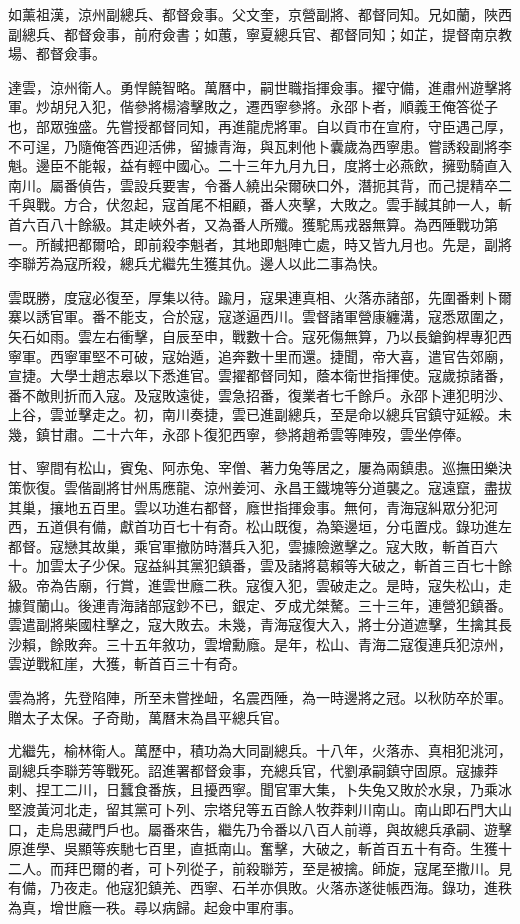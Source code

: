 \begin{pinyinscope}
如薰祖漢，涼州副總兵、都督僉事。父文奎，京營副將、都督同知。兄如蘭，陜西副總兵、都督僉事，前府僉書；如蕙，寧夏總兵官、都督同知；如芷，提督南京教場、都督僉事。

達雲，涼州衛人。勇悍饒智略。萬曆中，嗣世職指揮僉事。擢守備，進肅州遊擊將軍。炒胡兒入犯，偕參將楊濬擊敗之，遷西寧參將。永邵卜者，順義王俺答從子也，部眾強盛。先嘗授都督同知，再進龍虎將軍。自以貢市在宣府，守臣遇己厚，不可逞，乃隨俺答西迎活佛，留據青海，與瓦剌他卜囊歲為西寧患。嘗誘殺副將李魁。邊臣不能報，益有輕中國心。二十三年九月九日，度將士必燕飲，擁勁騎直入南川。屬番偵告，雲設兵要害，令番人繞出朵爾硤口外，潛扼其背，而己提精卒二千與戰。方合，伏忽起，寇首尾不相顧，番人夾擊，大敗之。雲手馘其帥一人，斬首六百八十餘級。其走峽外者，又為番人所殲。獲駝馬戎器無算。為西陲戰功第一。所馘把都爾哈，即前殺李魁者，其地即魁陣亡處，時又皆九月也。先是，副將李聯芳為寇所殺，總兵尤繼先生獲其仇。邊人以此二事為快。

雲既勝，度寇必復至，厚集以待。踰月，寇果連真相、火落赤諸部，先圍番剌卜爾寨以誘官軍。番不能支，合於寇，寇遂逼西川。雲督諸軍營康纏溝，寇悉眾圍之，矢石如雨。雲左右衝擊，自辰至申，戰數十合。寇死傷無算，乃以長鎗鉤桿專犯西寧軍。西寧軍堅不可破，寇始遁，追奔數十里而還。捷聞，帝大喜，遣官告郊廟，宣捷。大學士趙志皋以下悉進官。雲擢都督同知，蔭本衛世指揮使。寇歲掠諸番，番不敵則折而入寇。及寇敗遠徙，雲急招番，復業者七千餘戶。永邵卜連犯明沙、上谷，雲並擊走之。初，南川奏捷，雲已進副總兵，至是命以總兵官鎮守延綏。未幾，鎮甘肅。二十六年，永邵卜復犯西寧，參將趙希雲等陣歿，雲坐停俸。

甘、寧間有松山，賓兔、阿赤兔、宰僧、著力兔等居之，屢為兩鎮患。巡撫田樂決策恢復。雲偕副將甘州馬應龍、涼州姜河、永昌王鐵塊等分道襲之。寇遠竄，盡拔其巢，攘地五百里。雲以功進右都督，廕世指揮僉事。無何，青海寇糾眾分犯河西，五道俱有備，獻首功百七十有奇。松山既復，為築邊垣，分屯置戍。錄功進左都督。寇戀其故巢，乘官軍撤防時潛兵入犯，雲據險邀擊之。寇大敗，斬首百六十。加雲太子少保。寇益糾其黨犯鎮番，雲及諸將葛賴等大破之，斬首三百七十餘級。帝為告廟，行賞，進雲世廕二秩。寇復入犯，雲破走之。是時，寇失松山，走據賀蘭山。後連青海諸部寇鈔不已，銀定、歹成尤桀驁。三十三年，連營犯鎮番。雲遣副將柴國柱擊之，寇大敗去。未幾，青海寇復大入，將士分道遮擊，生擒其長沙賴，餘敗奔。三十五年敘功，雲增勳廕。是年，松山、青海二寇復連兵犯涼州，雲逆戰紅崖，大獲，斬首百三十有奇。

雲為將，先登陷陣，所至未嘗挫衄，名震西陲，為一時邊將之冠。以秋防卒於軍。贈太子太保。子奇勛，萬曆末為昌平總兵官。

尤繼先，榆林衛人。萬歷中，積功為大同副總兵。十八年，火落赤、真相犯洮河，副總兵李聯芳等戰死。詔進署都督僉事，充總兵官，代劉承嗣鎮守固原。寇據莽剌、捏工二川，日蠶食番族，且擾西寧。聞官軍大集，卜失兔又敗於水泉，乃乘冰堅渡黃河北走，留其黨可卜列、宗塔兒等五百餘人牧莽剌川南山。南山即石門大山口，走烏思藏門戶也。屬番來告，繼先乃令番以八百人前導，與故總兵承嗣、遊擊原進學、吳顯等疾馳七百里，直抵南山。奮擊，大破之，斬首百五十有奇。生獲十二人。而拜巴爾的者，可卜列從子，前殺聯芳，至是被擒。師旋，寇尾至撒川。見有備，乃夜走。他寇犯鎮羌、西寧、石羊亦俱敗。火落赤遂徙帳西海。錄功，進秩為真，增世廕一秩。尋以病歸。起僉中軍府事。


\end{pinyinscope}
